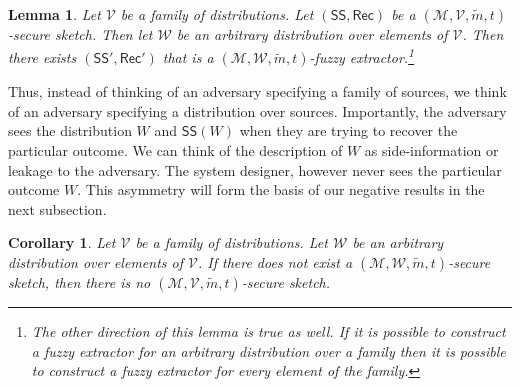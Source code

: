 \documentclass[11pt]{article}
\newcommand{\class}[1]{{\ensuremath{\mathsf{#1}}}}
\newcommand{\sketch}{\ensuremath{\class{SS}}\xspace}
\newcommand{\rec}{\ensuremath{\class{Rec}}\xspace}
\newtheorem{lemma}[theorem]{Lemma}
\newtheorem{corollary}[theorem]{Corollary}
\begin{document}
\begin{lemma}
\label{lem:quant switch fuzz}
Let $\mathcal{V}$ be a family of distributions.  Let $(\sketch, \rec)$ be a $(\mathcal{M}, \mathcal{V}, \tilde{m}, t)$-secure sketch.  Then let $\mathcal{W}$ be an arbitrary distribution over elements of $\mathcal{V}$.  Then there exists $(\sketch', \rec')$ that is a $(\mathcal{M}, \mathcal{W}, \tilde{m}, t)$-fuzzy extractor.\footnote{The other direction of this lemma is true as well.  If it is possible to construct a fuzzy extractor for an arbitrary distribution over a family then it is possible to construct a fuzzy extractor for every element of the family.}
\end{lemma}

Thus, instead of thinking of an adversary specifying a family of sources, we think of an adversary specifying a distribution over sources.  Importantly, the adversary sees the distribution $W$ and $\sketch(W)$ when they are trying to recover the particular outcome.  We can think of the description of $W$ as side-information or leakage to the adversary.  The system designer, however never sees the particular outcome $W$.  This asymmetry will form the basis of our negative results in the next subsection.

\begin{corollary}
\label{cor:no fuzz for dist}
Let $\mathcal{V}$ be a family of distributions.  Let $\mathcal{W}$ be an arbitrary distribution over elements of $\mathcal{V}$.  If there does not exist a $(\mathcal{M}, \mathcal{W}, \tilde{m}, t)$-secure sketch, then there is no $(\mathcal{M}, \mathcal{V}, \tilde{m}, t)$-secure sketch.
\end{corollary}

\end{document}
